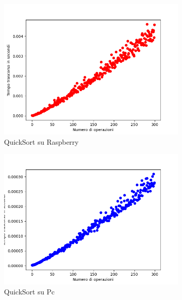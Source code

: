\documentclass{article}
\begin{document}
			\begin{figure}[h!]
				\centering
				
				\begin{subfigure}{0.6\textwidth}
					\centering
					\includegraphics[width = \textwidth]{./Plots/Raspberry_QuickSort.png}
					\caption{QuickSort su Raspberry}
				\end{subfigure}
				\begin{subfigure}{0.6\textwidth}
					\centering
					\includegraphics[width = \textwidth]{./Plots/Pc_QuickSort.png}
					\caption{QuickSort su Pc}
				\end{subfigure}
				\begin{subfigure}{0.6\textwidth}
					\centering

\end{subfigure}
\end{figure}
\end{document}
